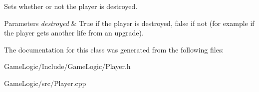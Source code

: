Sets whether or not the player is destroyed. 
\begin{DoxyParams}{Parameters}
{\em destroyed} & True if the player is destroyed, false if not (for example if the player gets another life from an upgrade). \\
\hline
\end{DoxyParams}


The documentation for this class was generated from the following files\+:\begin{DoxyCompactItemize}
\item 
Game\+Logic/\+Include/\+Game\+Logic/Player.\+h\item 
Game\+Logic/src/Player.\+cpp\end{DoxyCompactItemize}
